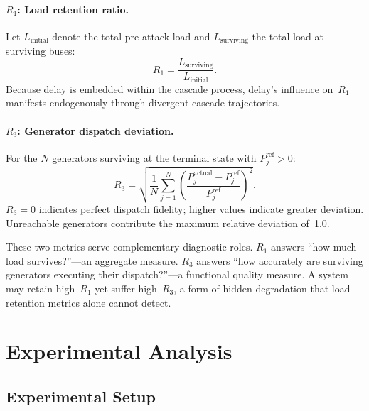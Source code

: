 \documentclass[a4paper,fleqn]{cas-dc}
\newcommand{\Rone}{R_1}
\newcommand{\Rthree}{R_3}
\begin{document}
\paragraph{$\Rone$: Load retention ratio.}
Let $L_{\text{initial}}$ denote the total pre-attack load and
$L_{\text{surviving}}$ the total load at surviving buses:
\begin{equation}\label{eq:R1}
  \Rone = \frac{L_{\text{surviving}}}{L_{\text{initial}}}.
\end{equation}
Because delay is embedded within the cascade process, delay's influence
on~$\Rone$ manifests endogenously through divergent cascade trajectories.

\paragraph{$\Rthree$: Generator dispatch deviation.}
For the $N$ generators surviving at the terminal state with
$P_j^{\text{ref}}>0$:
\begin{equation}\label{eq:R3}
  \Rthree = \sqrt{\frac{1}{N}\sum_{j=1}^{N}
    \left(\frac{P_j^{\text{actual}}-P_j^{\text{ref}}}{P_j^{\text{ref}}}\right)^{\!2}}.
\end{equation}
$\Rthree=0$ indicates perfect dispatch fidelity; higher values indicate
greater deviation.  Unreachable generators contribute the maximum
relative deviation of~1.0.

These two metrics serve complementary diagnostic roles.  $\Rone$ answers
``how much load survives?''---an aggregate measure.  $\Rthree$ answers
``how accurately are surviving generators executing their dispatch?''---a
functional quality measure.  A system may retain high~$\Rone$ yet suffer
high~$\Rthree$, a form of hidden degradation that load-retention metrics
alone cannot detect.


\section{Experimental Analysis}\label{sec:experiment}

\subsection{Experimental Setup}\label{sec:setup}
\end{document}
